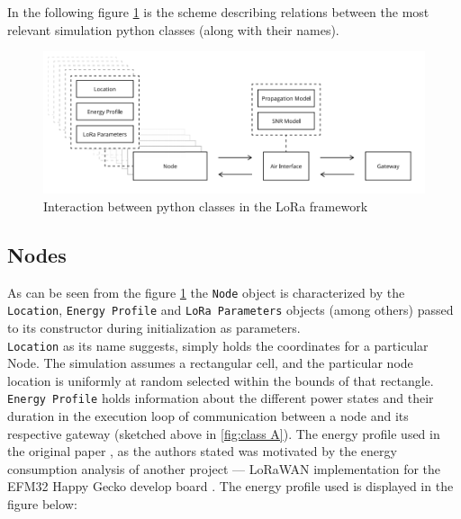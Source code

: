 In the following figure \ref{fig:architecture} is the scheme describing relations between the most relevant simulation python classes (along with their names).

\begin{figure}[h!]
  \centering
  \includegraphics[scale=0.6]{figures/architecture.PNG}
  \caption{Interaction between python classes in the LoRa framework \cite{simulator}}
  \label{fig:architecture}
\end{figure}

\subsection{Nodes}

As can be seen from the figure \ref{fig:architecture} the \texttt{Node} object is characterized by the \texttt{Location}, \texttt{Energy Profile} and \texttt{LoRa Parameters} objects (among others) passed to its constructor during initialization as parameters.\\

\texttt{Location} as its name suggests, simply holds the coordinates for a particular Node. The simulation assumes a rectangular cell, and the particular node location is uniformly at random selected within the bounds of that rectangle. \\

\texttt{Energy Profile} holds information about the different power states and their duration in the execution loop of communication between a node and its respective gateway (sketched above in \ref{fig:class A}). The energy profile used in the original paper \cite{simulator}, as the authors stated was motivated by the energy consumption analysis of another project — LoRaWAN implementation for the EFM32 Happy Gecko develop board \cite{energy_profile}. The energy profile used is displayed in the figure below:

